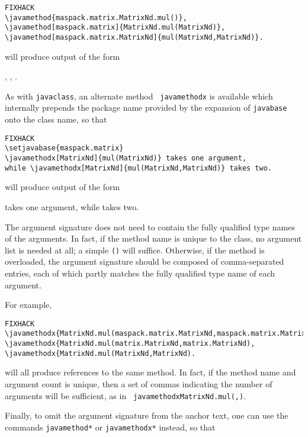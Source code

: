 \documentclass{article}
\begin{document}
\begin{lstlisting}FIXHACK
\javamethod{maspack.matrix.MatrixNd.mul()}, 
\javamethod[maspack.matrix]{MatrixNd.mul(MatrixNd)},
\javamethod[maspack.matrix.MatrixNd]{mul(MatrixNd,MatrixNd)}.
\end{lstlisting}

will produce output of the form

\setjavabase{}
, 
,
.

As with {\tt \BKS javaclass}, an alternate method {\tt \BKS
javamethodx} is available which internally prepends the package name
provided by the expansion of {\tt \BKS javabase} onto the class name,
so that

\begin{lstlisting}FIXHACK
\setjavabase{maspack.matrix}
\javamethodx[MatrixNd]{mul(MatrixNd)} takes one argument,
while \javamethodx[MatrixNd]{mul(MatrixNd,MatrixNd)} takes two.
\end{lstlisting}

will produce output of the form

 takes one argument,
while  takes two.

The argument signature does not need to contain the fully qualified
type names of the arguments. In fact, if the method name is unique to
the class, no argument list is needed at all; a simple {\tt ()} will
suffice.  Otherwise, if the method is overloaded, the argument
signature should be composed of comma-separated entries, each of which
partly matches the fully qualified type name of each argument.

For example,

\begin{lstlisting}FIXHACK
\javamethodx{MatrixNd.mul(maspack.matrix.MatrixNd,maspack.matrix.MatrixNd), 
\javamethodx{MatrixNd.mul(matrix.MatrixNd,matrix.MatrixNd),
\javamethodx{MatrixNd.mul(MatrixNd,MatrixNd).
\end{lstlisting}

will all produce references to the same method. In fact, if the method
name and argument count is unique, then a set of commas indicating the
number of arguments will be sufficient, as in {\tt
\BKS javamethodx{MatrixNd.mul(,)}}.

Finally, to omit the argument signature from
the anchor text, one can use the commands {\tt \BKS javamethod*}
or {\tt \BKS javamethodx*} instead, so that
\end{document}
